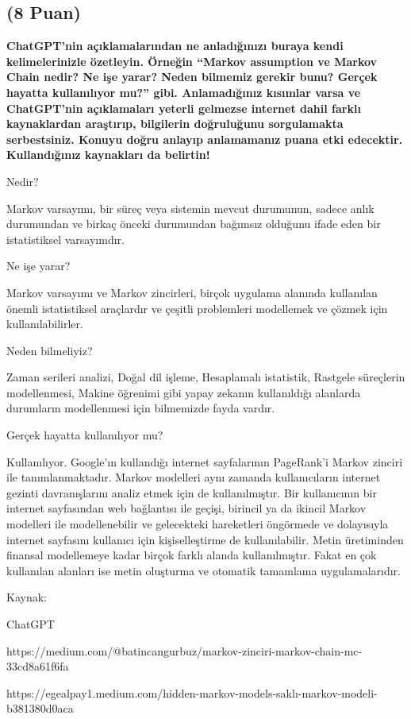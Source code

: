 \documentclass[11pt]{article}
\begin{document}
\subsection{(8 Puan)} \textbf{ChatGPT’nin açıklamalarından ne anladığınızı buraya kendi kelimelerinizle özetleyin. Örneğin ``Markov assumption ve Markov Chain nedir? Ne işe yarar? Neden bilmemiz gerekir bunu? Gerçek hayatta kullanılıyor mu?'' gibi. Anlamadığınız kısımlar varsa ve ChatGPT’nin açıklamaları yeterli gelmezse internet dahil farklı kaynaklardan araştırıp, bilgilerin doğruluğunu sorgulamakta serbestsiniz. Konuyu doğru anlayıp anlamamanız puana etki edecektir. Kullandığınız kaynakları da belirtin!}


Nedir?

Markov varsayımı, bir süreç veya sistemin mevcut durumunun, sadece anlık durumundan ve birkaç önceki durumundan bağımsız olduğunu ifade eden bir istatistiksel varsayımdır.

Ne işe yarar?

Markov varsayımı ve Markov zincirleri, birçok uygulama alanında kullanılan önemli istatistiksel araçlardır ve çeşitli problemleri modellemek ve çözmek için kullanılabilirler.

Neden bilmeliyiz?

Zaman serileri analizi, Doğal dil işleme, Hesaplamalı istatistik, Rastgele süreçlerin modellenmesi, Makine öğrenimi gibi yapay zekanın kullanıldığı alanlarda durumların modellenmesi için bilmemizde fayda vardır. 

Gerçek hayatta kullanılıyor mu?

Kullanılıyor. Google’ın kullandığı internet sayfalarının PageRank'i Markov zinciri ile tanımlanmaktadır. Markov modelleri aynı zamanda kullanıcıların internet gezinti davranışlarını analiz etmek için de kullanılmıştır. Bir kullanıcının bir internet sayfasından web bağlantısı ile geçişi, birincil ya da ikincil Markov modelleri ile modellenebilir ve gelecekteki hareketleri öngörmede ve dolayısıyla internet sayfasını kullanıcı için kişiselleştirme de kullanılabilir. Metin üretiminden finansal modellemeye kadar birçok farklı alanda kullanılmıştır. Fakat en çok kullanılan alanları ise metin oluşturma ve otomatik tamamlama uygulamalarıdır.

Kaynak:

ChatGPT

https://medium.com/@batincangurbuz/markov-zinciri-markov-chain-mc-33cd8a61f6fa

https://egealpay1.medium.com/hidden-markov-models-saklı-markov-modeli-b381380d0aca
\end{document}
